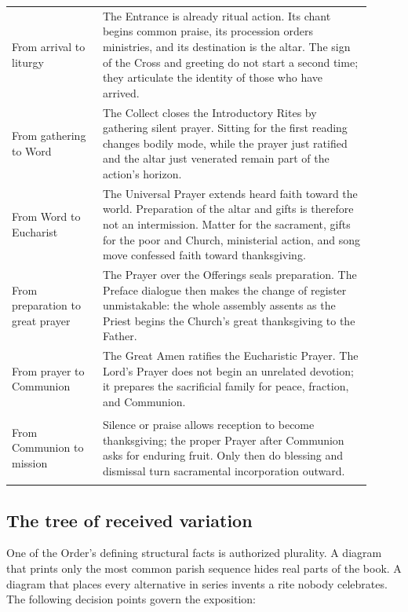 \noindent\begin{tabular}{>{\bfseries\raggedright\arraybackslash}p{0.23\linewidth}>{\raggedright\arraybackslash}p{0.68\linewidth}}
From arrival to liturgy & The Entrance is already ritual action. Its chant begins common praise, its procession orders ministries, and its destination is the altar. The sign of the Cross and greeting do not start a second time; they articulate the identity of those who have arrived.\\
From gathering to Word & The Collect closes the Introductory Rites by gathering silent prayer. Sitting for the first reading changes bodily mode, while the prayer just ratified and the altar just venerated remain part of the action's horizon.\\
From Word to Eucharist & The Universal Prayer extends heard faith toward the world. Preparation of the altar and gifts is therefore not an intermission. Matter for the sacrament, gifts for the poor and Church, ministerial action, and song move confessed faith toward thanksgiving.\\
From preparation to great prayer & The Prayer over the Offerings seals preparation. The Preface dialogue then makes the change of register unmistakable: the whole assembly assents as the Priest begins the Church's great thanksgiving to the Father.\\
From prayer to Communion & The Great Amen ratifies the Eucharistic Prayer. The Lord's Prayer does not begin an unrelated devotion; it prepares the sacrificial family for peace, fraction, and Communion.\\
From Communion to mission & Silence or praise allows reception to become thanksgiving; the proper Prayer after Communion asks for enduring fruit. Only then do blessing and dismissal turn sacramental incorporation outward.\\
\end{tabular}

\subsection{The tree of received variation}

One of the Order's defining structural facts is authorized plurality. A diagram that prints only the most common parish sequence hides real parts of the book. A diagram that places every alternative in series invents a rite nobody celebrates. The following decision points govern the exposition:

